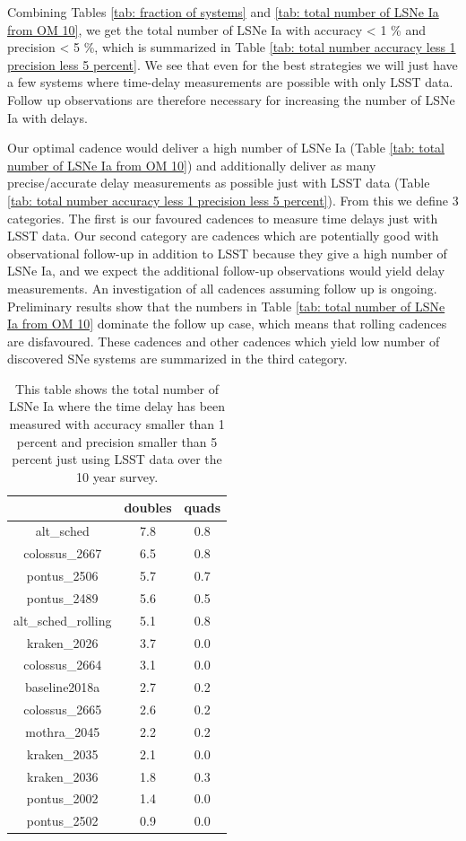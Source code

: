 Combining Tables \ref{tab: fraction of systems} and \ref{tab: total
  number of LSNe Ia from OM 10}, we get the total number of LSNe Ia
with accuracy < 1 \% and precision < 5 \%, which is summarized in
Table \ref{tab: total number accuracy less 1 precision less 5
  percent}. We see that even for the best strategies we will just have
a few systems where time-delay measurements are possible with only
LSST data. Follow up observations are therefore necessary for
increasing the number of LSNe Ia with delays.

Our optimal cadence would deliver a high number of LSNe Ia (Table
\ref{tab: total number of LSNe Ia from OM 10}) and additionally
deliver as many precise/accurate delay measurements as possible just
with LSST data (Table \ref{tab: total number accuracy less 1 precision
  less 5 percent}). From this we define 3 categories. The first is our
favoured cadences to measure time delays just with LSST data. Our
second category are cadences which are potentially good with
observational follow-up in addition to LSST because they give a high
number of LSNe Ia, and we expect the additional follow-up observations
would yield delay measurements. An investigation of all cadences
assuming follow up is ongoing. Preliminary results show that the
numbers in Table \ref{tab: total number of LSNe Ia from OM 10}
dominate the follow up case, which means that rolling cadences are
disfavoured. These cadences and other cadences which yield low number
of discovered SNe systems are summarized in the third category.
%
\begin{table}
\centering
\begin{tabular}{c|c|c}
& doubles & quads \\
\hline
alt\_sched & 7.8 & 0.8 \\
\hline
colossus\_2667 & 6.5 &0.8 \\
\hline
pontus\_2506 & 5.7 & 0.7 \\
\hline
pontus\_2489 & 5.6 &0.5 \\
\hline
alt\_sched\_rolling & 5.1 &0.8 \\
\hline
kraken\_2026 & 3.7 &0.0 \\
\hline
colossus\_2664 & 3.1 &0.0 \\
\hline
baseline2018a & 2.7 &0.2  \\
\hline
colossus\_2665 & 2.6 &0.2 \\
\hline
mothra\_2045 &2.2 &0.2  \\
\hline
kraken\_2035 & 2.1 &0.0  \\
\hline
kraken\_2036 & 1.8 &0.3 \\
\hline
pontus\_2002 & 1.4 &0.0 \\
\hline
pontus\_2502 & 0.9 &0.0 \\
\end{tabular}
\caption{This table shows the total number of LSNe Ia where the time
  delay has been measured with accuracy smaller than 1 percent and
  precision smaller than 5 percent just using LSST data over the 10
  year survey. }
\label{tab: total number accuracy less 1 precision less 5 percent}
\end{table}


